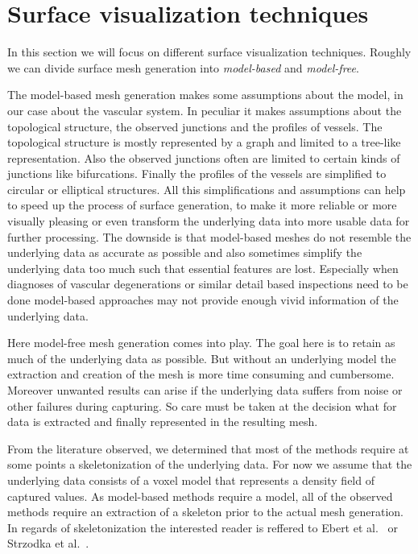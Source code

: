 

\section{Surface visualization techniques}

In this section we will focus on different surface visualization techniques. Roughly we can divide surface mesh generation into \emph{model-based} and \emph{model-free}.

The model-based mesh generation makes some assumptions about the model, in our case about the vascular system.
In peculiar it makes assumptions about the topological structure, the observed junctions and the profiles of vessels. The topological structure is mostly represented by a graph and limited to a tree-like representation. Also the observed junctions often are limited to certain kinds of junctions like bifurcations. Finally the profiles of the vessels are simplified to circular or elliptical structures.
All this simplifications and assumptions can help to speed up the process of surface generation, to make it more reliable or more visually pleasing or even transform the underlying data into more usable data for further processing. The downside is that model-based meshes do not resemble the underlying data as accurate as possible and also sometimes simplify the underlying data too much such that essential features are lost.
Especially when diagnoses of vascular degenerations or similar detail based inspections need to be done model-based approaches may not provide enough vivid information of the underlying data.

Here model-free mesh generation comes into play. The goal here is to retain as much of the underlying data as possible. But without an underlying model the extraction and creation of the mesh is more time consuming and cumbersome. Moreover unwanted results can arise if the underlying data suffers from noise or other failures during capturing. So care must be taken at the decision what for data is extracted and finally represented in the resulting mesh.

From the literature observed, we determined that most of the methods require at some points a skeletonization of the underlying data. For now we assume that the underlying data consists of a voxel model that represents a density field of captured values. As model-based methods require a model, all of the observed methods require an extraction of a skeleton prior to the actual mesh generation. In regards of skeletonization the interested reader is reffered to Ebert et al.~\cite{ebert2002augmented} or  Strzodka et al.~\cite{strzodka2004generalized}.

